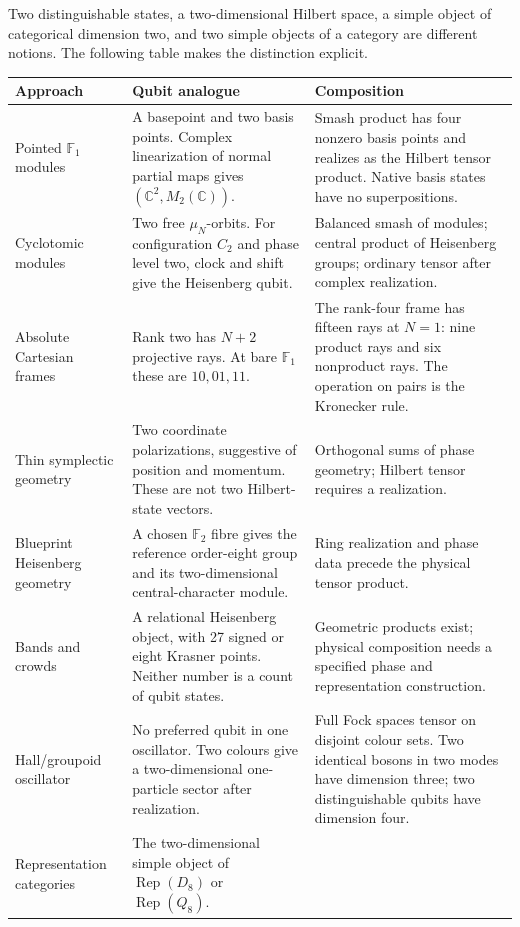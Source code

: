 Two distinguishable states, a two-dimensional Hilbert space, a simple object
of categorical dimension two, and two simple objects of a category are
different notions. The following table makes the distinction explicit.

\begin{longtable}{@{}p{3.1cm}p{5.1cm}p{6.5cm}@{}}
\toprule
Approach & Qubit analogue & Composition \\
\midrule
\endhead
Pointed $\mathbb F_1$ modules & A basepoint and two basis points. Complex
linearization of normal partial maps gives $(\mathbb C^2,M_2(\mathbb C))$.
& Smash product has four nonzero basis points and realizes as the Hilbert
tensor product. Native basis states have no superpositions.\\[3pt]
Cyclotomic modules & Two free $\mu_N$-orbits. For configuration $C_2$ and
phase level two, clock and shift give the Heisenberg qubit.
& Balanced smash of modules; central product of Heisenberg groups; ordinary
tensor after complex realization.\\[3pt]
Absolute Cartesian frames & Rank two has $N+2$ projective rays. At bare
$\mathbb F_1$ these are $10,01,11$.
& The rank-four frame has fifteen rays at $N=1$: nine product rays and six
nonproduct rays. The operation on pairs is the Kronecker rule.\\[3pt]
Thin symplectic geometry & Two coordinate polarizations, suggestive of
position and momentum. These are not two Hilbert-state vectors.
& Orthogonal sums of phase geometry; Hilbert tensor requires a realization.\\[3pt]
Blueprint Heisenberg geometry & A chosen $\mathbb F_2$ fibre gives the
reference order-eight group and its two-dimensional central-character module.
& Ring realization and phase data precede the physical tensor product.\\[3pt]
Bands and crowds & A relational Heisenberg object, with 27 signed or eight
Krasner points. Neither number is a count of qubit states.
& Geometric products exist; physical composition needs a specified phase
and representation construction.\\[3pt]
Hall/groupoid oscillator & No preferred qubit in one oscillator. Two colours
give a two-dimensional one-particle sector after realization.
& Full Fock spaces tensor on disjoint colour sets. Two identical bosons in
two modes have dimension three; two distinguishable qubits have dimension four.\\[3pt]
Representation categories & The two-dimensional simple object of
$\operatorname{Rep}(D_8)$ or $\operatorname{Rep}(Q_8)$.

\end{longtable}
